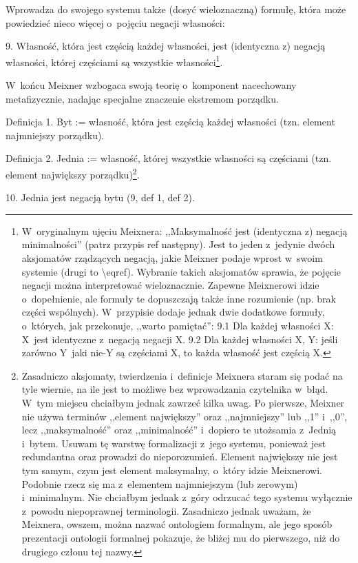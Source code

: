 Wprowadza do swojego systemu także (dosyć wieloznaczną) formułę, która może powiedzieć nieco więcej o~pojęciu negacji własności:

9. Własność, która jest częścią każdej własności, jest (identyczna z) negacją własności, której częściami są wszystkie własności\footnote{ W~oryginalnym ujęciu Meixnera: ,,Maksymalność jest (identyczna z) negacją minimalności'' (patrz przypis ref następny). Jest to jeden z~jedynie dwóch aksjomatów rządzących negacją, jakie Meixner podaje wprost w~swoim systemie (drugi to {\textbackslash}eqref). Wybranie takich aksjomatów sprawia, że pojęcie negacji można interpretować wieloznacznie. Zapewne Meixnerowi idzie o~dopełnienie, ale formuły te dopuszczają także inne rozumienie (np. brak części wspólnych). W~przypisie dodaje jednak dwie dodatkowe formuły, o~których, jak przekonuje, ,,warto pamiętać'': 9.1 Dla każdej własności X: X~jest identyczne z~negacją negacji X. 9.2 Dla każdej własności X, Y: jeśli zarówno Y~jaki nie-Y są częściami X, to każda własność jest częścią X.}.

W~końcu Meixner wzbogaca swoją teorię o~komponent nacechowany metafizycznie, nadając specjalne znaczenie ekstremom porządku.

Definicja 1. Byt := własność, która jest częścią każdej własności (tzn. element najmniejszy porządku).

Definicja 2. Jednia := własność, której wszystkie własności są częściami (tzn. element największy porządku)\footnote{ Zasadniczo aksjomaty, twierdzenia i~definicje Meixnera staram się podać na tyle wiernie, na ile jest to możliwe bez wprowadzania czytelnika w~błąd. W~tym miejscu chciałbym jednak zawrzeć kilka uwag. Po pierwsze, Meixner nie używa terminów ,,element największy'' oraz ,,najmniejszy'' lub ,,1'' i~,,0'', lecz ,,maksymalność'' oraz ,,minimalność'' i~dopiero te utożsamia z~Jednią i~bytem. Usuwam tę warstwę formalizacji z~jego systemu, ponieważ jest redundantna oraz prowadzi do nieporozumień. Element największy nie jest tym samym, czym jest element maksymalny, o~który idzie Meixnerowi. Podobnie rzecz się ma z~elementem najmniejszym (lub zerowym) i~minimalnym. Nie chciałbym jednak z~góry odrzucać tego systemu wyłącznie z~powodu niepoprawnej terminologii. Zasadniczo jednak uważam, że Meixnera, owszem, można nazwać ontologiem formalnym, ale jego sposób prezentacji ontologii formalnej pokazuje, że bliżej mu do pierwszego, niż do drugiego członu tej nazwy.}.

10. Jednia jest negacją bytu (9, def 1, def 2).

